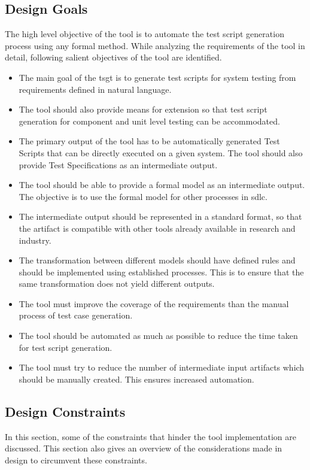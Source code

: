 \subsection{Design Goals}
The high level objective of the tool is to automate the test script generation process using any formal method. While analyzing the requirements of the tool in detail, following salient objectives of the tool are identified.
\begin{itemize}
\item The main goal of the \gls{tsgt} is to generate test scripts for system testing from requirements defined in natural language.
\item The tool should also provide means for extension so that test script generation for component and unit level testing can be accommodated.
\item The primary output of the tool has to be automatically generated Test Scripts that can be directly executed on a given system. The tool should also provide Test Specifications as an intermediate output.
\item The tool should be able to provide a formal model as an intermediate output. The objective is to use the formal model for other processes in \gls{sdlc}.
\item The intermediate output should be represented in a standard format, so that the artifact is compatible with other tools already available in research and industry.
\item The transformation between different models should have defined rules and should be implemented using established processes. This is to ensure that the same transformation does not yield different outputs.
\item The tool must improve the coverage of the requirements than the manual process of test case generation.
\item The tool should be automated as much as possible to reduce the time taken for test script generation.
\item The tool must try to reduce the number of intermediate input artifacts which should be manually created. This ensures increased automation.
\end{itemize}


\subsection{Design Constraints}
In this section, some of the constraints that hinder the tool implementation are discussed. This section also gives an overview of the considerations made in design to circumvent these constraints.

